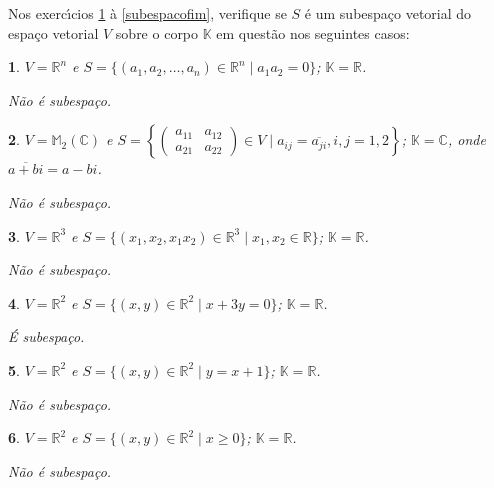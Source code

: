 \documentclass[12pt]{exam}
\newtheorem{exercicio}{}
\newcommand{\real}{\mathbb{R}}
\newcommand{\complex}{\mathbb{C}}
\newcommand{\cp}[1]{\mathbb{#1}}
\begin{document}
Nos exerc{\'\i}cios \ref{subespacoinicio} \`a \ref{subespacofim}, verifique se $S$ \'e um subespa\c{c}o vetorial do espa\c{c}o vetorial $V$ sobre o corpo $\cp{K}$ em quest\~ao nos seguintes casos:
\begin{exercicio}\label{subespacoinicio}
$V = \real^n$ e $S = \{(a_1, a_2, \dots, a_n) \in \real^n \mid a_1a_2 = 0\}$; $\cp{K} = \real$.
\begin{solucao}
  N\~ao \'e subespa\c{c}o.
\end{solucao}
\end{exercicio}

\begin{exercicio}
$V = \cp{M}_2(\complex)$ e $S = \left\{\begin{pmatrix} a_{11} & a_{12}\\ a_{21} & a_{22}\end{pmatrix} \in V \mid a_{ij} = \overline{a_{ji}}, i, j = 1, 2\right\}$; $\cp{K} = \complex$, onde $\overline{a + bi} = a - bi$.
\begin{solucao}
  N\~ao \'e subespa\c{c}o.
\end{solucao}
\end{exercicio}

\begin{exercicio}
$V = \real^3$ e $S = \{(x_1, x_2, x_1x_2) \in \real^3 \mid x_1, x_2 \in \real\}$; $\cp{K} = \real$.
\begin{solucao}
  N\~ao \'e subespa\c{c}o.
\end{solucao}
\end{exercicio}

\begin{exercicio}
$V = \real^2$ e $S = \{(x, y) \in \real^2 \mid x + 3y = 0\}$; $\cp{K} = \real$.
\begin{solucao}
  \'E subespa\c{c}o.
\end{solucao}
\end{exercicio}

\begin{exercicio}
$V = \real^2$ e $S = \{(x, y) \in \real^2 \mid y = x + 1\}$; $\cp{K} = \real$.
\begin{solucao}
  N\~ao \'e subespa\c{c}o.
\end{solucao}
\end{exercicio}

\begin{exercicio}
$V = \real^2$ e $S = \{(x, y) \in \real^2 \mid x \ge 0\}$; $\cp{K} = \real$.
\begin{solucao}
  N\~ao \'e subespa\c{c}o.
\end{solucao}
\end{exercicio}
\end{document}
